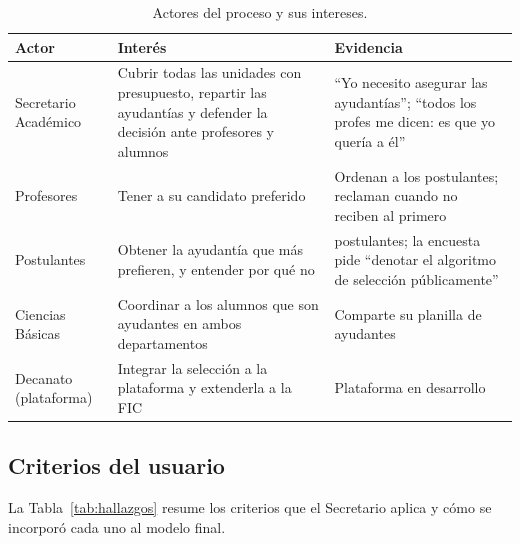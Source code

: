 \documentclass{article}
\begin{document}
\begin{table}[H]
\centering
\small
\begin{tabularx}{\textwidth}{l >{\raggedright\arraybackslash}X >{\raggedright\arraybackslash}X}
\toprule
\textbf{Actor} & \textbf{Interés} & \textbf{Evidencia} \\
\midrule
Secretario Académico & Cubrir todas las unidades con presupuesto, repartir las ayudantías y defender la decisión ante profesores y alumnos & ``Yo necesito asegurar las ayudantías''; ``todos los profes me dicen: es que yo quería a él'' \\
Profesores & Tener a su candidato preferido & Ordenan a los postulantes; reclaman cuando no reciben al primero \\
Postulantes & Obtener la ayudantía que más prefieren, y entender por qué no & 149 postulantes; la encuesta pide ``denotar el algoritmo de selección públicamente'' \\
Ciencias Básicas & Coordinar a los alumnos que son ayudantes en ambos departamentos & Comparte su planilla de ayudantes \\
Decanato (plataforma) & Integrar la selección a la plataforma y extenderla a la FIC & Plataforma en desarrollo \\
\bottomrule
\end{tabularx}
\caption{Actores del proceso y sus intereses.}
\label{tab:stakeholders}
\end{table}

\subsection{Criterios del usuario}

La Tabla~\ref{tab:hallazgos} resume los criterios que el Secretario aplica y cómo se incorporó cada uno al modelo final.
\end{document}
